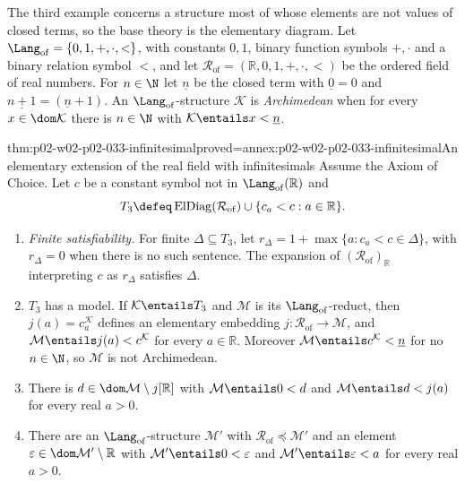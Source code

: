 The third example concerns a structure most of whose elements are not values
of closed terms, so the base theory is the elementary diagram.  Let
\(\Lang_{\mathrm{of}}=\{0,1,+,\cdot,<\}\), with constants \(0,1\), binary
function symbols \(+,\cdot\) and a binary relation symbol \(<\), and let
\(\mathcal R_{\mathrm{of}}=(\mathbb R,0,1,+,\cdot,<)\) be the ordered field of
real numbers.  For \(n\in\N\) let \(\underline n\) be the closed term with
\(\underline 0=0\) and \(\underline{n+1}=(\underline n+1)\).  An
\(\Lang_{\mathrm{of}}\)-structure \(\mathcal K\) is \emph{Archimedean} when
for every \(x\in\dom\mathcal K\) there is \(n\in\N\) with
\(\mathcal K\entails x<\underline n\).

\begin{hbtheorem}{thm:p02-w02-p02-033-infinitesimal}{proved=annex:p02-w02-p02-033-infinitesimal}{An elementary extension of the real field with infinitesimals}
Assume the Axiom of Choice.  Let \(c\) be a constant symbol not in
\(\Lang_{\mathrm{of}}(\mathbb R)\) and
\[
 T_3\defeq\operatorname{ElDiag}(\mathcal R_{\mathrm{of}})\cup
 \{c_a<c:a\in\mathbb R\}.
\]
\begin{enumerate}
  \item \emph{Finite satisfiability.}  For finite \(\Delta\subseteq T_3\),
        let \(r_\Delta=1+\max\{a:c_a<c\in\Delta\}\), with \(r_\Delta=0\)
        when there is no such sentence.  The expansion of
        \((\mathcal R_{\mathrm{of}})_{\mathbb R}\) interpreting \(c\) as
        \(r_\Delta\) satisfies \(\Delta\).
  \item \(T_3\) has a model.  If \(\mathcal K\entails T_3\) and
        \(\mathcal M\) is its \(\Lang_{\mathrm{of}}\)-reduct, then
        \(j(a)=c_a^{\mathcal K}\) defines an elementary embedding
        \(j:\mathcal R_{\mathrm{of}}\to\mathcal M\), and
        \(\mathcal M\entails j(a)<c^{\mathcal K}\) for every
        \(a\in\mathbb R\).  Moreover
        \(\mathcal M\entails c^{\mathcal K}<\underline n\) for no
        \(n\in\N\), so \(\mathcal M\) is not Archimedean.
  \item There is \(d\in\dom\mathcal M\setminus j[\mathbb R]\) with
        \(\mathcal M\entails0<d\) and \(\mathcal M\entails d<j(a)\) for every
        real \(a>0\).
  \item There are an \(\Lang_{\mathrm{of}}\)-structure \(\mathcal M'\) with
        \(\mathcal R_{\mathrm{of}}\preccurlyeq\mathcal M'\) and an element
        \(\varepsilon\in\dom\mathcal M'\setminus\mathbb R\) with
        \(\mathcal M'\entails0<\varepsilon\) and
        \(\mathcal M'\entails\varepsilon<a\) for every real \(a>0\).
\end{enumerate}
\end{hbtheorem}

